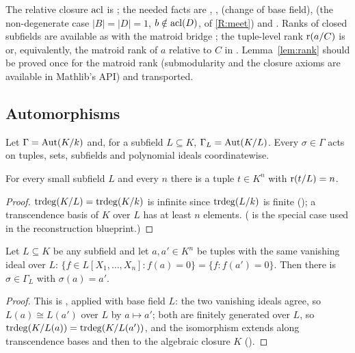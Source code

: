 \begin{leannote}
The relative closure $\operatorname{acl}$ is ; the needed facts are
, ,
 (change of base field),
 (the non-degenerate case $|B|=|D|=1$,
$b\notin\operatorname{acl}(D)$, of \ref{R:meet})
and .  Ranks of closed
subfields are available as  with the matroid bridge
; the tuple-level rank $\operatorname{r}(a/C)$ is
or, equivalently, the matroid rank of $a$ relative to $C$ in
.  Lemma~\ref{lem:rank} should be proved once
for the matroid rank (submodularity and the closure axioms are available in Mathlib's
 API) and transported.
\end{leannote}

\subsection{Automorphisms}

Let $\Gamma=\operatorname{Aut}(K/k)$ and, for a subfield $L\subseteq K$, $\Gamma_L=\operatorname{Aut}(K/L)$.
Every $\sigma\in\Gamma$ acts on tuples, sets, subfields and polynomial ideals
coordinatewise.

\begin{lemma}\label{lem:fresh}
For every small subfield $L$ and every $n$ there is a tuple $t\in K^n$ with
$\operatorname{r}(t/L)=n$.
\end{lemma}
\begin{proof}
$\operatorname{trdeg}(K/L)=\operatorname{trdeg}(K/k)$ is infinite since $\operatorname{trdeg}(L/k)$ is finite
(); a transcendence basis of $K$ over $L$ has at least $n$
elements.  ( is the special case used in
the reconstruction blueprint.)
\end{proof}

\begin{lemma}\label{lem:conj}
Let $L\subseteq K$ be any subfield and let $a,a'\in K^n$ be tuples with the same
vanishing ideal over $L$:
$\{f\in L[X_1,\dots,X_n]: f(a)=0\}=\{f: f(a')=0\}$.  Then there is
$\sigma\in\Gamma_L$ with $\sigma(a)=a'$.
\end{lemma}
\begin{proof}
This is , applied with base
field $L$: the two vanishing ideals agree, so $L(a)\cong L(a')$ over $L$ by
$a\mapsto a'$; both are finitely generated over $L$, so $\operatorname{trdeg}(K/L(a))=\operatorname{trdeg}(K/L(a'))$,
and the isomorphism extends along transcendence bases and then to the algebraic
closure $K$ ().
\end{proof}

